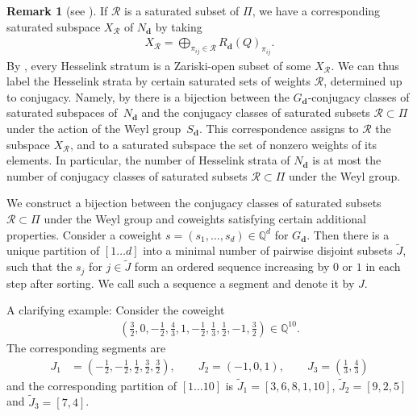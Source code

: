 \documentclass[pdftex]{sigma}
\newcommand{\R}{\mathcal{R}}
\numberwithin{equation}{section}
\theoremstyle{definition}
\newtheorem{Remark}[Theorem]{Remark}
\begin{document}
\begin{Remark}[{see \cite[Section 2.2]{LB}}] \label{rem saturated subsets}
If $\R$ is a saturated subset of $\Pi$, we have a corresponding saturated subspace $X_\R$ of $N_{\mathbf{d}}$ by taking
\begin{align*}
X_\R = \bigoplus_{\pi_{ij} \in \R} R_{\mathbf{d}}(Q)_{\pi_{ij}} .
\end{align*}
By \cite[Section 2.2]{LB}, every Hesselink stratum is a Zariski-open subset of some $X_\R$. We can thus label the Hesselink strata by certain saturated sets of weights $\R$, determined up to conjugacy. Namely, by \cite{Hesse} there is a bijection between the $G_{\mathbf{d}}$-conjugacy classes of saturated subspaces of~$N_{\mathbf{d}}$ and the conjugacy classes of saturated subsets $\R \subset \Pi$ under the action of the Weyl group~$S_{\mathbf{d}}$. %
This correspondence assigns to $\R$ the subspace $X_\R$, and to a saturated subspace the set of nonzero weights of its elements. In particular, the number of Hesselink strata of $N_{\mathbf{d}}$ is at most the number of conjugacy classes of saturated subsets $\R \subset \Pi$ under the Weyl group.

 \end{Remark}
We construct a bijection between the conjugacy classes of saturated subsets $\R \subset \Pi$ under the Weyl group and coweights satisfying certain additional properties.
Consider a coweight $s=(s_1, \dots, s_d) \in \mathbb{Q}^d$ for $G_{\mathbf{d}}$. Then there is a unique partition of $[1 \dots d]$ into a minimal number of pairwise disjoint subsets $\tilde{J}$, such that the $s_j$ for $j\in\tilde{J}$ form an ordered sequence increasing by $0$ or $1$ in each step after sorting. We call such a sequence a segment and denote it by $J$.

A clarifying example: Consider the coweight
\begin{align*}
\left(\frac{3}{2}, 0, -\frac{1}{2}, \frac{4}{3}, 1, - \frac{1}{2}, \frac{1}{3}, \frac{1}{2}, -1,\frac{3}{2}\right) \in \mathbb{Q}^{10} .
\end{align*}
The corresponding segments are
\begin{align*}
J_1 &= \left(-\frac{1}{2}, -\frac{1}{2}, \frac{1}{2}, \frac{3}{2}, \frac{3}{2}\right) , \qquad
J_2 = (-1, 0, 1) ,\qquad
J_3 = \left(\frac{1}{3}, \frac{4}{3}\right)
\end{align*}
and the corresponding partition of $[1 \dots 10]$ is $\tilde{J}_1 = [3, 6, 8, 1, 10]$, $\tilde{J}_2 = [9, 2, 5]$ and $\tilde{J}_3 = [7, 4]$.
\end{document}
